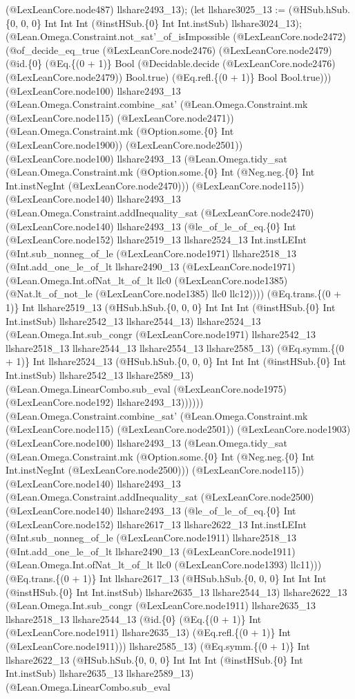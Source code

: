\documentclass[11pt]{article}
\begin{document}
(@LexLeanCore.node487) llshare2493\_13); (let llshare3025\_13 := (@HSub.hSub.\{0, 0, 0\} Int Int Int (@instHSub.\{0\} Int Int.instSub) llshare3024\_13); (@Lean.Omega.Constraint.not\_sat'\_of\_isImpossible (@LexLeanCore.node2472) (@of\_decide\_eq\_true (@LexLeanCore.node2476) (@LexLeanCore.node2479) (@id.\{0\} (@Eq.\{(0 + 1)\} Bool (@Decidable.decide (@LexLeanCore.node2476) (@LexLeanCore.node2479)) Bool.true) (@Eq.refl.\{(0 + 1)\} Bool Bool.true))) (@LexLeanCore.node100) llshare2493\_13 (@Lean.Omega.Constraint.combine\_sat' (@Lean.Omega.Constraint.mk (@LexLeanCore.node115) (@LexLeanCore.node2471)) (@Lean.Omega.Constraint.mk (@Option.some.\{0\} Int (@LexLeanCore.node1900)) (@LexLeanCore.node2501)) (@LexLeanCore.node100) llshare2493\_13 (@Lean.Omega.tidy\_sat (@Lean.Omega.Constraint.mk (@Option.some.\{0\} Int (@Neg.neg.\{0\} Int Int.instNegInt (@LexLeanCore.node2470))) (@LexLeanCore.node115)) (@LexLeanCore.node140) llshare2493\_13 (@Lean.Omega.Constraint.addInequality\_sat (@LexLeanCore.node2470) (@LexLeanCore.node140) llshare2493\_13 (@le\_of\_le\_of\_eq.\{0\} Int (@LexLeanCore.node152) llshare2519\_13 llshare2524\_13 Int.instLEInt (@Int.sub\_nonneg\_of\_le (@LexLeanCore.node1971) llshare2518\_13 (@Int.add\_one\_le\_of\_lt llshare2490\_13 (@LexLeanCore.node1971) (@Lean.Omega.Int.ofNat\_lt\_of\_lt llc0 (@LexLeanCore.node1385) (@Nat.lt\_of\_not\_le (@LexLeanCore.node1385) llc0 llc12)))) (@Eq.trans.\{(0 + 1)\} Int llshare2519\_13 (@HSub.hSub.\{0, 0, 0\} Int Int Int (@instHSub.\{0\} Int Int.instSub) llshare2542\_13 llshare2544\_13) llshare2524\_13 (@Lean.Omega.Int.sub\_congr (@LexLeanCore.node1971) llshare2542\_13 llshare2518\_13 llshare2544\_13 llshare2554\_13 llshare2585\_13) (@Eq.symm.\{(0 + 1)\} Int llshare2524\_13 (@HSub.hSub.\{0, 0, 0\} Int Int Int (@instHSub.\{0\} Int Int.instSub) llshare2542\_13 llshare2589\_13) (@Lean.Omega.LinearCombo.sub\_eval (@LexLeanCore.node1975) (@LexLeanCore.node192) llshare2493\_13)))))) (@Lean.Omega.Constraint.combine\_sat' (@Lean.Omega.Constraint.mk (@LexLeanCore.node115) (@LexLeanCore.node2501)) (@LexLeanCore.node1903) (@LexLeanCore.node100) llshare2493\_13 (@Lean.Omega.tidy\_sat (@Lean.Omega.Constraint.mk (@Option.some.\{0\} Int (@Neg.neg.\{0\} Int Int.instNegInt (@LexLeanCore.node2500))) (@LexLeanCore.node115)) (@LexLeanCore.node140) llshare2493\_13 (@Lean.Omega.Constraint.addInequality\_sat (@LexLeanCore.node2500) (@LexLeanCore.node140) llshare2493\_13 (@le\_of\_le\_of\_eq.\{0\} Int (@LexLeanCore.node152) llshare2617\_13 llshare2622\_13 Int.instLEInt (@Int.sub\_nonneg\_of\_le (@LexLeanCore.node1911) llshare2518\_13 (@Int.add\_one\_le\_of\_lt llshare2490\_13 (@LexLeanCore.node1911) (@Lean.Omega.Int.ofNat\_lt\_of\_lt llc0 (@LexLeanCore.node1393) llc11))) (@Eq.trans.\{(0 + 1)\} Int llshare2617\_13 (@HSub.hSub.\{0, 0, 0\} Int Int Int (@instHSub.\{0\} Int Int.instSub) llshare2635\_13 llshare2544\_13) llshare2622\_13 (@Lean.Omega.Int.sub\_congr (@LexLeanCore.node1911) llshare2635\_13 llshare2518\_13 llshare2544\_13 (@id.\{0\} (@Eq.\{(0 + 1)\} Int (@LexLeanCore.node1911) llshare2635\_13) (@Eq.refl.\{(0 + 1)\} Int (@LexLeanCore.node1911))) llshare2585\_13) (@Eq.symm.\{(0 + 1)\} Int llshare2622\_13 (@HSub.hSub.\{0, 0, 0\} Int Int Int (@instHSub.\{0\} Int Int.instSub) llshare2635\_13 llshare2589\_13) (@Lean.Omega.LinearCombo.sub\_eval 
\end{document}
